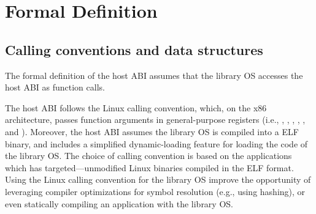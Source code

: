 

\section{Formal Definition}


\subsection{Calling conventions and data structures}


The formal definition of the host ABI assumes that 
the library OS accesses the host ABI as function calls.






The host ABI follows the Linux calling convention,
which, on the x86 architecture, passes function arguments in general-purpose registers (i.e., , , , , , and ).
Moreover, the host ABI assumes the library OS is compiled into a ELF binary, and includes a simplified dynamic-loading feature for loading the code of the library OS.
The choice of calling convention is based on
the applications which \graphene{} has targeted---unmodified Linux binaries compiled in the ELF format.
Using the Linux calling convention for the library OS
improve the opportunity of leveraging compiler optimizations for symbol resolution (e.g., using hashing), or even statically compiling an application with the library OS. 







